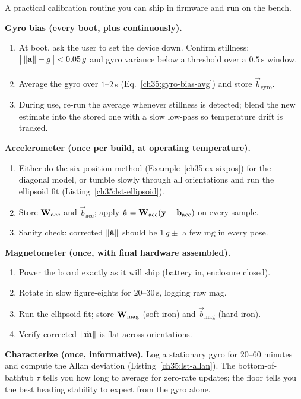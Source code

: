\begin{buildbox}
A practical calibration routine you can ship in firmware and run on the bench.

\textbf{Gyro bias (every boot, plus continuously).}
\begin{enumerate}
\item At boot, ask the user to set the device down. Confirm stillness:
$\bigl|\,\lVert\mathbf{a}\rVert-g\,\bigr| < 0.05\,g$ and gyro variance below a threshold
over a $0.5\,\mathrm{s}$ window.
\item Average the gyro over $1$--$2\,\mathrm{s}$ (Eq.~\ref{ch35:gyro-bias-avg})
and store $\hat{\vec b}_{\text{gyro}}$.
\item During use, re-run the average whenever stillness is detected; blend the new
estimate into the stored one with a slow low-pass so temperature drift is tracked.
\end{enumerate}

\textbf{Accelerometer (once per build, at operating temperature).}
\begin{enumerate}
\item Either do the six-position method (Example~\ref{ch35:ex-sixpos}) for the
diagonal model, or tumble slowly through all orientations and run the ellipsoid
fit (Listing~\ref{ch35:lst-ellipsoid}).
\item Store $\mathbf{W}_{\text{acc}}$ and $\vec{b}_{\text{acc}}$; apply
$\hat{\mathbf{a}}=\mathbf{W}_{\text{acc}}(\mathbf{y}-\mathbf{b}_{\text{acc}})$ on every sample.
\item Sanity check: corrected $\lVert\hat{\mathbf{a}}\rVert$ should be $1\,g\pm$ a few
$\mathrm{mg}$ in every pose.
\end{enumerate}

\textbf{Magnetometer (once, with final hardware assembled).}
\begin{enumerate}
\item Power the board exactly as it will ship (battery in, enclosure closed).
\item Rotate in slow figure-eights for $20$--$30\,\mathrm{s}$, logging raw mag.
\item Run the ellipsoid fit; store $\mathbf{W}_{\text{mag}}$ (soft iron) and
$\vec{b}_{\text{mag}}$ (hard iron).
\item Verify corrected $\lVert\hat{\mathbf{m}}\rVert$ is flat across orientations.
\end{enumerate}

\textbf{Characterize (once, informative).} Log a stationary gyro for $20$--$60$
minutes and compute the Allan deviation (Listing~\ref{ch35:lst-allan}). The
bottom-of-bathtub $\tau$ tells you how long to average for zero-rate updates; the
floor tells you the best heading stability to expect from the gyro alone.
\end{buildbox}

